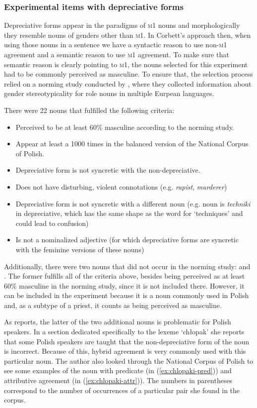 \subsubsection{Experimental items with depreciative forms}
Depreciative forms appear in the paradigms of \textsc{m1} nouns and morphologically they resemble nouns of genders other than \textsc{m1}. In Corbett's approach then, when using those nouns in a sentence we have a syntactic reason to use non-\textsc{m1} agreement and a semantic reason to use \textsc{m1} agreement. To make sure that semantic reason is clearly pointing to \textsc{m1}, the nouns selected for this experiment had to be commonly perceived as masculine. To ensure that, the selection process relied on a norming study conducted by \cite{misersky_norms_2014}, where they collected information about gender stereotypicality for role nouns in multiple Eurpean languages.

There were 22 nouns that fulfilled the following criteria:
\begin{itemize}
  \item Perceived to be at least 60\% masculine according to the norming study.
  \item Appear at least a 1000 times in the balanced version of the National Corpus of Polish.
  \item Depreciative form is not syncretic with the non-depreciative.
  \item Does not have disturbing, violent connotations (e.g. \textsl{rapist}, \textsl{murderer})
  \item Depreciative form is not syncretic with a different noun (e.g. noun  is \textsl{techniki} in depreciative, which has the same shape as the word for `techniques' and could lead to confusion)
  \item Is not a nominalized adjective (for which depreciative forms are syncretic with the feminine versions of these nouns)
\end{itemize}
Additionally, there were two nouns that did not occur in the norming study:  and . The former fulfills all of the criteria above, besides being perceived as at least 60\% masculine in the norming study, since it is not included there. However, it can be included in the experiment because it is a noun commonly used in Polish and, as a subtype of a priest, it counts as being perceived as masculine.

As \cite{skowronska_konstrukcje_2011} reports, the latter of the two additional nouns is problematic for Polish speakers. In a section dedicated specifically to the lexeme `chłopak' she reports that some Polish speakers are taught that the non-depreciative form of the noun is incorrect. Because of this, hybrid agreement is very commonly used with this particular noun. The author also looked through the National Corpus of Polish to see some examples of the noun with predicate (in (\ref{ex:chlopaki-pred})) and attributive agreement (in (\ref{ex:chlopaki-attr})). The numbers in parentheses correspond to the number of occurrences of a particular pair she found in the corpus.

